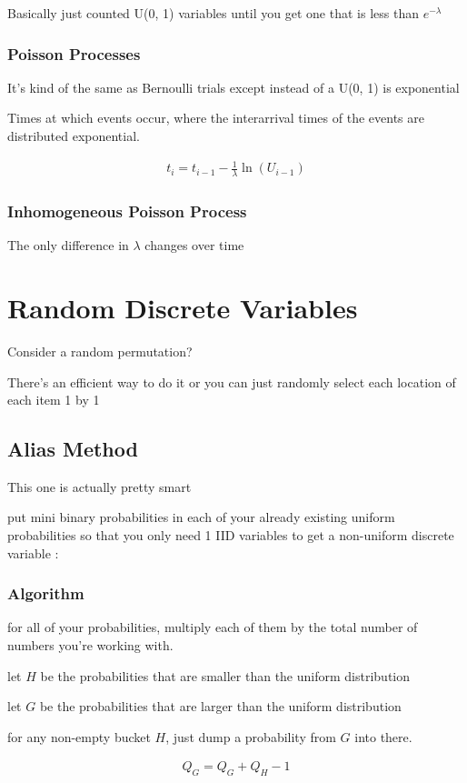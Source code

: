 \documentclass[fleqn]{report}
\newcommand{\equations} [1] {
\begin{gather*}
#1
\end{gather*}
}
\begin{document}
Basically just counted U(0, 1) variables until you get one that is 
less than $e^{- \lambda}$

\subsection{Poisson Processes}
It's kind of the same as Bernoulli trials except instead of 
a U(0, 1) is exponential 

Times at which events occur, where the interarrival times of
the events are distributed exponential.

\equations{
    t_i 
    =
    t_{i - 1}
    -
    \frac{1}{\lambda}
    \ln(U_{i - 1})
}

\subsection{Inhomogeneous Poisson Process}
The only difference in $\lambda$ changes over time 

\chapter{Random Discrete Variables}
Consider a random permutation?

There's an efficient way to do it or you can just randomly select 
each location of each item 1 by 1 

\section{Alias Method}
This one is actually pretty smart 

put mini binary probabilities in each of your already existing uniform 
probabilities so that you only need 1 IID variables 
to get a non-uniform discrete variable :

\subsection{Algorithm}
for all of your probabilities, multiply each of them by 
the total number of numbers you're working with. 

let $H$ be the probabilities that are smaller than the uniform distribution 

let $G$ be the probabilities that are larger than the uniform distribution 

for any non-empty bucket $H$, just dump a probability from $G$ into there. 
\equations{
    Q_{G} 
    =
    Q_{G} + Q_{H} - 1 
}
\end{document}
